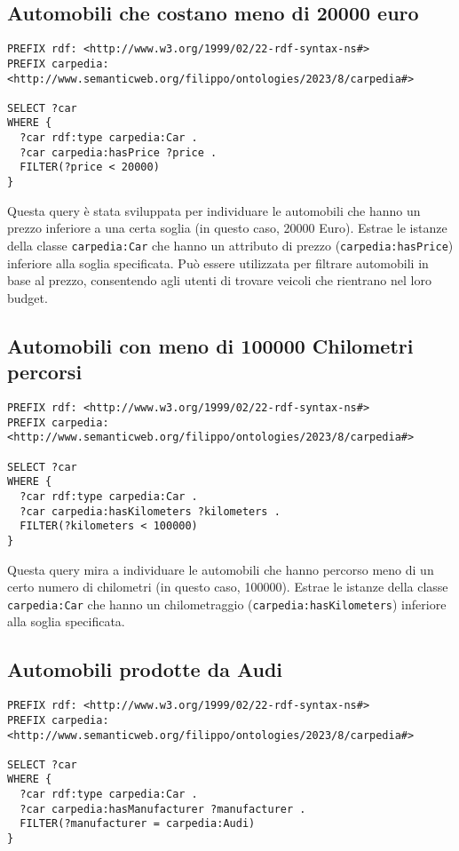 \subsection{Automobili che costano meno di 20000 euro}

\begin{lstlisting}[language=SPARQL]
PREFIX rdf: <http://www.w3.org/1999/02/22-rdf-syntax-ns#>
PREFIX carpedia: <http://www.semanticweb.org/filippo/ontologies/2023/8/carpedia#>

SELECT ?car
WHERE {
  ?car rdf:type carpedia:Car .
  ?car carpedia:hasPrice ?price .
  FILTER(?price < 20000)
}
\end{lstlisting}

Questa query è stata sviluppata per individuare le automobili che hanno un prezzo inferiore a una certa
soglia (in questo caso, 20000 Euro). Estrae le istanze della classe \texttt{carpedia:Car} che hanno un attributo di prezzo
(\texttt{carpedia:hasPrice}) inferiore alla soglia specificata. Può essere utilizzata per filtrare automobili in base al prezzo, consentendo agli utenti di trovare veicoli che rientrano nel loro budget.

\subsection{Automobili con meno di 100000 Chilometri percorsi}

\begin{lstlisting}[language=SPARQL]
PREFIX rdf: <http://www.w3.org/1999/02/22-rdf-syntax-ns#>
PREFIX carpedia: <http://www.semanticweb.org/filippo/ontologies/2023/8/carpedia#>

SELECT ?car
WHERE {
  ?car rdf:type carpedia:Car .
  ?car carpedia:hasKilometers ?kilometers .
  FILTER(?kilometers < 100000)
}
\end{lstlisting}


Questa query mira a individuare le automobili che hanno percorso meno di un certo numero di chilometri
(in questo caso, 100000). Estrae le istanze della classe \texttt{carpedia:Car} che hanno un chilometraggio
(\texttt{carpedia:hasKilometers}) inferiore alla soglia specificata.

\subsection{Automobili prodotte da Audi}

\begin{lstlisting}[language=SPARQL]
PREFIX rdf: <http://www.w3.org/1999/02/22-rdf-syntax-ns#>
PREFIX carpedia: <http://www.semanticweb.org/filippo/ontologies/2023/8/carpedia#>

SELECT ?car
WHERE {
  ?car rdf:type carpedia:Car .
  ?car carpedia:hasManufacturer ?manufacturer .
  FILTER(?manufacturer = carpedia:Audi)
}
\end{lstlisting}


